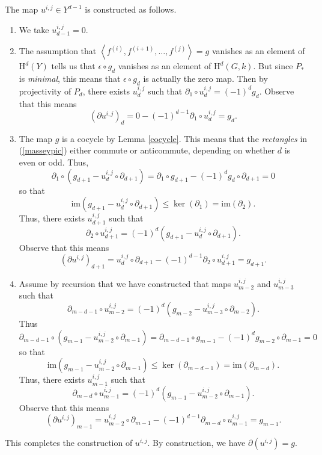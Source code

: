 \documentclass[12pt]{article}
\begin{document}
The map $u^{i,j}\in Y^{d-1}$ is constructed as follows.
\begin{enumerate}
\item\label{zero} We take $u^{i,j}_{d-1}=0$. 
\item The assumption that
$\left\langle f^{\left(i\right)},
f^{\left(i+1\right)},\dots,f^{\left(j\right)}\right\rangle=g$ 
vanishes as an element of $\mathrm{H}^d\left(Y\right)$
tells us that $\epsilon\circ g_d$ vanishes
as an element of $\mathrm{H}^d\left(G,k\right)$.
But since $P_\ast$ is {\em minimal}, this means
that $\epsilon\circ g_d$ is actually the zero map.
Then by projectivity of $P_d$, there exists
$u^{i,j}_d$ such that $\partial_1\circ u^{i,j}_d=\left(-1\right)^d g_d$.
Observe that this  means
\[\left(\partial u^{i,j}\right)_d
=0-\left(-1\right)^{d-1}\partial_1\circ u^{i,j}_d=g_d.\]
\item The map $g$ is a cocycle by Lemma \ref{cocycle}. 
This means that the {\em rectangles} in (\ref{masseypic})
either commute or anticommute, depending on whether $d$
is even or odd. Thus,
\[\partial_1\circ
\left(g_{d+1}-u_d^{i,j}\circ\partial_{d+1}\right)
=\partial_1\circ g_{d+1}
-\left(-1\right)^d g_d\circ\partial_{d+1}=0\]
so that
\[\mathrm{im}\left(g_{d+1}-
u_d^{i,j}\circ\partial_{d+1}\right)\le\ker\left(\partial_1\right)
=\mathrm{im}\left(\partial_2\right).\]
Thus, there exists $u^{i,j}_{d+1}$ such that
\[\partial_2\circ u^{i,j}_{d+1}=
\left(-1\right)^d\left(g_{d+1}- u_d^{i,j}\circ\partial_{d+1}\right).\]
Observe that this means
\[\left(\partial u^{i,j}\right)_{d+1}
=u^{i,j}_d\circ\partial_{d+1}-\left(-1\right)^{d-1}
\partial_2\circ u^{i,j}_{d+1}=g_{d+1}.\]
\item Assume by recursion that we have constructed that maps $u^{i,j}_{m-2}$ and $u_{m-3}^{i,j}$ such that
\[\partial_{m-d-1}\circ u^{i,j}_{m-2}=
\left(-1\right)^d\left(g_{m-2}
-u_{m-3}^{i,j}\circ\partial_{m-2}\right).\] Thus
\[\partial_{m-d-1}\circ
\left(g_{m-1}-u_{m-2}^{i,j}\circ\partial_{m-1}\right)
=\partial_{m-d-1}\circ g_{m-1}
-\left(-1\right)^d g_{m-2}\circ\partial_{m-1}=0\]
so that
\[\mathrm{im}\left(g_{m-1}-
u_{m-2}^{i,j}\circ\partial_{m-1}\right)\le\ker\left(\partial_{m-d-1}\right)
=\mathrm{im}\left(\partial_{m-d}\right).\]
Thus, there exists $u^{i,j}_{m-1}$ such that
\[\partial_{m-d}\circ u^{i,j}_{m-1}=
\left(-1\right)^d\left(g_{m-1}- u_{m-2}^{i,j}\circ\partial_{m-1}\right).\]
Observe that this means
\[\left(\partial u^{i,j}\right)_{m-1}=
u^{i,j}_{m-2}\circ\partial_{m-1}-\left(-1\right)^{d-1}
\partial_{m-d}\circ u^{i,j}_{m-1}=g_{m-1}.\]
\end{enumerate}
This completes the construction of $u^{i,j}$.
By construction, we have $\partial\left(u^{i,j}\right)=g$.
\end{document}
